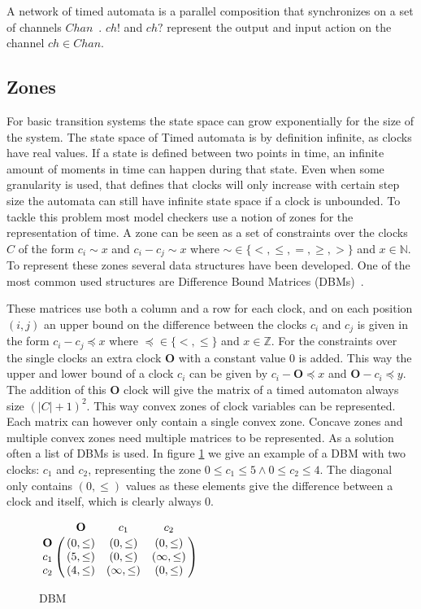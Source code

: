 A network of timed automata is a parallel composition that synchronizes on a set of channels $Chan$~\cite{UPPAAL}. $ch!$ and $ch?$ represent the output and input action on the channel $ch \in Chan$.


\subsection{Zones}
For basic transition systems the state space can grow exponentially for the size of the system. The state space of Timed automata is by definition infinite, as clocks have real values. If a state is defined between two points in time, an infinite amount of moments in time can happen during that state. Even when some granularity is used, that defines that clocks will only increase with certain step size the automata can still have infinite state space if a clock is unbounded. To tackle this problem most model checkers use a notion of zones for the representation of time. A zone can be seen as a set of constraints over the clocks $C$
 of the form $c_i \sim x$ and $c_i - c_j \sim x$ where $\sim  \in \{<, \leq, =, \geq, >\}$ and $x \in \mathbb{N}$. To represent these zones several data structures have been developed. One of the most common used structures are Difference Bound Matrices (DBMs)~\cite{dbmorig,bengtsson2002clocks}.
 
These matrices use both a column and a row for each clock, and on each position $(i,j)$ an upper bound on the difference between the clocks $c_i$ and $c_j$ is given in the form $c_i - c_j \preceq x$ where $\preceq \in \{<, \leq\}$ and $x \in \mathbb{Z}$. For the constraints over the single clocks an extra clock $\mathbf{O}$ with a constant value 0 is added. This way the upper and lower bound of a clock $c_i$ can be given by $c_i - \mathbf{O} \preceq x$ and $\mathbf{O} - c_i \preceq y$. The addition of this $\mathbf{O}$ clock will give the matrix of a timed automaton always size $(|C|+1)^2$. This way convex zones of clock variables can be represented. Each matrix can however only contain a single convex zone. Concave zones and multiple convex zones need multiple matrices to be represented. As a solution often a list of DBMs is used. In figure \ref{fig:dbm} we give an example of a DBM with two clocks: $c_1$ and $c_2$, representing the zone $0 \leq c_1 \leq 5 \wedge 0 \leq c_2 \leq 4$. The diagonal only contains $(0,\leq)$ values as these elements give the difference between a clock and itself, which is clearly always 0.

\begin{figure}
	\centering
	\begin{math}
 \bordermatrix{ 		                 & \mathbf{O} & c_1           & c_2        \cr
 			\mathbf{O} &(0,\leq)      & (0,\leq)      & (0,\leq)     \cr
 			c_1        &(5,\leq)      & (0,\leq)      & (\infty,\leq)\cr
 			c_2        &(4,\leq)      & (\infty,\leq) & (0,\leq)     \cr}
	\end{math}
	\caption{DBM}
	\label{fig:dbm}
\end{figure}

